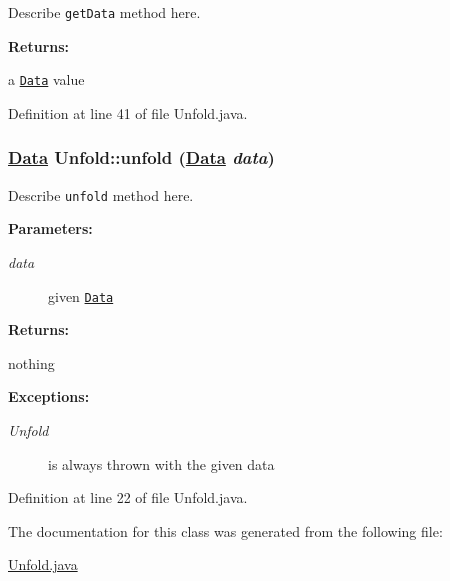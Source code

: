 Describe {\tt get\-Data} method here.

\begin{Desc}
\item[{\bf Returns: }]\par
a {\tt \hyperlink{interfaceData}{Data}} value \end{Desc}


Definition at line 41 of file Unfold.java.\hypertarget{classUnfold_d0}{
\subsubsection[unfold]{\setlength{\rightskip}{0pt plus 5cm}\hyperlink{interfaceData}{Data} Unfold::unfold (\hyperlink{interfaceData}{Data} {\em data})}}
\label{classUnfold_d0}


Describe {\tt unfold} method here.

\begin{Desc}
\item[{\bf Parameters: }]\par
\begin{description}
\item[
{\em data}]given {\tt \hyperlink{interfaceData}{Data}}  \end{description}
\end{Desc}
\begin{Desc}
\item[{\bf Returns: }]\par
nothing \end{Desc}
\begin{Desc}
\item[{\bf Exceptions: }]\par
\begin{description}
\item[
{\em Unfold}] is always thrown with the given data \end{description}
\end{Desc}


Definition at line 22 of file Unfold.java.

The documentation for this class was generated from the following file:\begin{CompactItemize}
\item 
\hyperlink{Unfold_8java-source}{Unfold.java}\end{CompactItemize}
